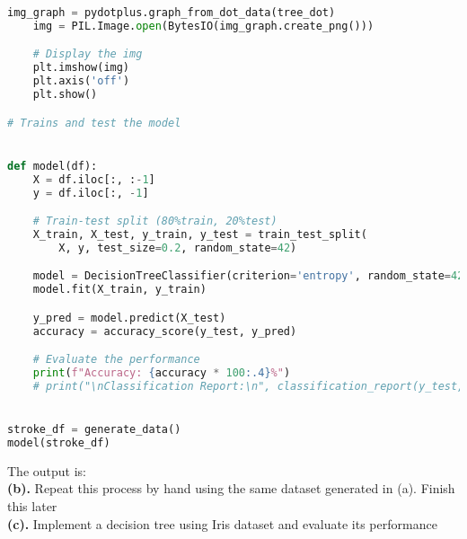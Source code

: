 \documentclass[12pt,letterpaper]{article}
\begin{document}
\begin{lstlisting}[language=Python, breaklines=true, columns=flexible, frame=single]
    img_graph = pydotplus.graph_from_dot_data(tree_dot)
    img = PIL.Image.open(BytesIO(img_graph.create_png()))

    # Display the img
    plt.imshow(img)
    plt.axis('off')
    plt.show()

# Trains and test the model


def model(df):
    X = df.iloc[:, :-1]
    y = df.iloc[:, -1]

    # Train-test split (80%train, 20%test)
    X_train, X_test, y_train, y_test = train_test_split(
        X, y, test_size=0.2, random_state=42)

    model = DecisionTreeClassifier(criterion='entropy', random_state=42)
    model.fit(X_train, y_train)

    y_pred = model.predict(X_test)
    accuracy = accuracy_score(y_test, y_pred)

    # Evaluate the performance
    print(f"Accuracy: {accuracy * 100:.4}%")
    # print("\nClassification Report:\n", classification_report(y_test, y_pred))


stroke_df = generate_data()
model(stroke_df)
\end{lstlisting}
The output is: 
\vspace{.2in}
\\ \textbf{(b).} Repeat this process by hand using the same dataset generated in (a).
Finish this later
\vspace{.2in}
\\ \textbf{(c).} Implement a decision tree using Iris dataset and evaluate its performance
\vspace{.2in}
\end{document}
